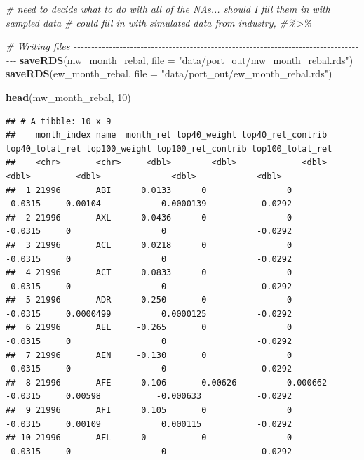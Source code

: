 \documentclass[
]{article}
\newenvironment{Shaded}{\begin{snugshade}}{\end{snugshade}}
\newcommand{\CommentTok}[1]{\textcolor[rgb]{0.56,0.35,0.01}{\textit{#1}}}
\newcommand{\DataTypeTok}[1]{\textcolor[rgb]{0.13,0.29,0.53}{#1}}
\newcommand{\DecValTok}[1]{\textcolor[rgb]{0.00,0.00,0.81}{#1}}
\newcommand{\KeywordTok}[1]{\textcolor[rgb]{0.13,0.29,0.53}{\textbf{#1}}}
\newcommand{\NormalTok}[1]{#1}
\newcommand{\StringTok}[1]{\textcolor[rgb]{0.31,0.60,0.02}{#1}}
\begin{document}
\begin{Shaded}
\begin{Highlighting}[]
\CommentTok{\# need to decide what to do with all of the NAs... should I fill them in with sampled data}
\CommentTok{\# could fill in with simulated data from industry, }
\CommentTok{\#\%\textgreater{}\% }

\CommentTok{\# Writing files {-}{-}{-}{-}{-}{-}{-}{-}{-}{-}{-}{-}{-}{-}{-}{-}{-}{-}{-}{-}{-}{-}{-}{-}{-}{-}{-}{-}{-}{-}{-}{-}{-}{-}{-}{-}{-}{-}{-}{-}{-}{-}{-}{-}{-}{-}{-}{-}{-}{-}{-}{-}{-}{-}{-}{-}{-}{-}{-}{-}{-}{-}{-}{-}{-}{-}{-}{-}{-}{-}{-}{-}{-}{-}{-}{-}{-}{-}{-}{-}{-}{-}{-}{-}}
\KeywordTok{saveRDS}\NormalTok{(mw\_month\_rebal, }\DataTypeTok{file =} \StringTok{"data/port\_out/mw\_month\_rebal.rds"}\NormalTok{)}
\KeywordTok{saveRDS}\NormalTok{(ew\_month\_rebal, }\DataTypeTok{file =} \StringTok{"data/port\_out/ew\_month\_rebal.rds"}\NormalTok{)}

\KeywordTok{head}\NormalTok{(mw\_month\_rebal, }\DecValTok{10}\NormalTok{)}
\end{Highlighting}
\end{Shaded}

\begin{verbatim}
## # A tibble: 10 x 9
##    month_index name  month_ret top40_weight top40_ret_contrib top40_total_ret top100_weight top100_ret_contrib top100_total_ret
##    <chr>       <chr>     <dbl>        <dbl>             <dbl>           <dbl>         <dbl>              <dbl>            <dbl>
##  1 21996       ABI      0.0133      0                0                -0.0315     0.00104            0.0000139          -0.0292
##  2 21996       AXL      0.0436      0                0                -0.0315     0                  0                  -0.0292
##  3 21996       ACL      0.0218      0                0                -0.0315     0                  0                  -0.0292
##  4 21996       ACT      0.0833      0                0                -0.0315     0                  0                  -0.0292
##  5 21996       ADR      0.250       0                0                -0.0315     0.0000499          0.0000125          -0.0292
##  6 21996       AEL     -0.265       0                0                -0.0315     0                  0                  -0.0292
##  7 21996       AEN     -0.130       0                0                -0.0315     0                  0                  -0.0292
##  8 21996       AFE     -0.106       0.00626         -0.000662         -0.0315     0.00598           -0.000633           -0.0292
##  9 21996       AFI      0.105       0                0                -0.0315     0.00109            0.000115           -0.0292
## 10 21996       AFL      0           0                0                -0.0315     0                  0                  -0.0292
\end{verbatim}
\end{document}
